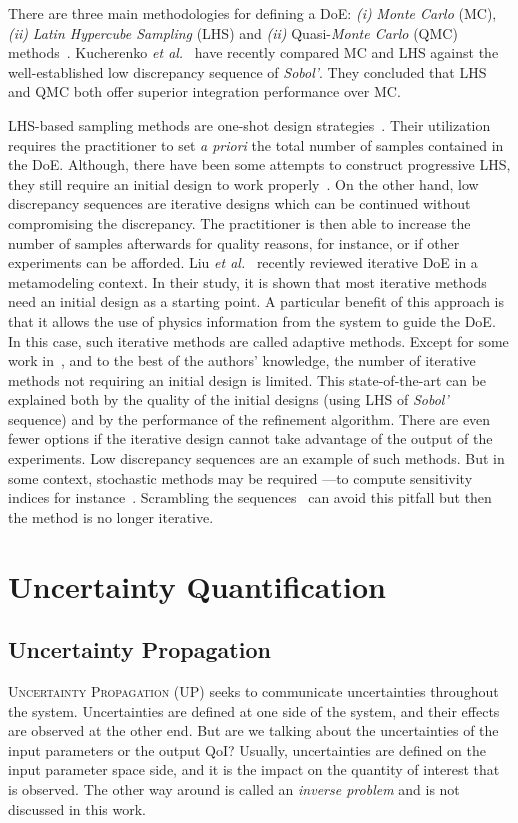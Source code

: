 There are three main methodologies for defining a DoE: \emph{(i)} \emph{Monte Carlo} (MC), \emph{(ii)} \emph{Latin Hypercube Sampling} (LHS) and \emph{(ii)} Quasi-\emph{Monte Carlo} (QMC) methods~\citep{Cavazzuti2013,Garud2017}. Kucherenko \emph{et al.}~\citep{Kucherenko2015} have recently compared MC and LHS against the well-established low discrepancy sequence of \emph{Sobol'}. They concluded that LHS and QMC both offer superior integration performance over MC.

LHS-based sampling methods are one-shot design strategies~\citep{Mckay1979,Fang2006}. Their utilization requires the practitioner to set \emph{a priori} the total number of samples contained in the DoE. Although, there have been some attempts to construct progressive LHS, they still require an initial design to work properly~\citep{Sheikholeslami2017}. On the other hand, low discrepancy sequences are iterative designs which can be continued without compromising the discrepancy. The practitioner is then able to increase the number of samples afterwards for quality reasons, for instance, or if other experiments can be afforded. Liu \emph{et al.}~\citep{Liu2018} recently reviewed iterative DoE in a metamodeling context. In their study, it is shown that most iterative methods need an initial design as a starting point. A particular benefit of this approach is that it allows the use of physics information from the system to guide the DoE. In this case, such iterative methods are called adaptive methods. Except for some work in~\citep{Crombecq2011}, and to the best of the authors’ knowledge, the number of iterative methods not requiring an initial design is limited. This state-of-the-art can be explained both by the quality of the initial designs (using LHS of \emph{Sobol'} sequence) and by the performance of the refinement algorithm. There are even fewer options if the iterative design cannot take advantage of the output of the experiments. Low discrepancy sequences are an example of such methods. But in some context, stochastic methods may be required ---\thinspace to compute sensitivity indices for instance~\citep{Saltelli2010}. Scrambling the sequences~\citep{Owen1998} can avoid this pitfall but then the method is no longer iterative.

\section{Uncertainty Quantification}\label{sec:uq}

\subsection{Uncertainty Propagation}\label{sec:up}
\lettrine{U}{ncertainty Propagation} (UP) seeks to communicate uncertainties throughout the system. Uncertainties are defined at one side of the system, and their effects are observed at the other end. But are we talking about the uncertainties of the input parameters or the output QoI? Usually, uncertainties are defined on the input parameter space side, and it is the impact on the quantity of interest that is observed. The other way around is called an \emph{inverse problem} and is not discussed in this work.

